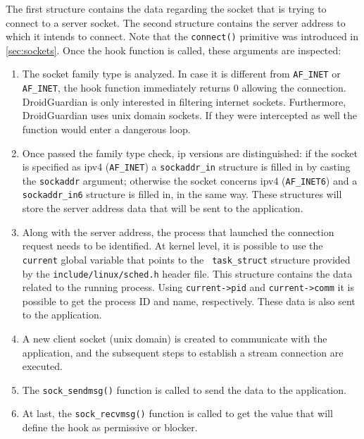 The first structure contains the data regarding the socket that is trying to connect to a server socket. The second structure contains the server address to which it intends to connect. Note that the \texttt{connect()} primitive was introduced in \autoref{sec:sockets}. Once the hook function is called, these arguments are inspected:

\begin{enumerate}
\item The socket family type is analyzed. In case it is different from \texttt{AF\_INET} or \texttt{AF\_INET}, the hook function immediately returns 0 allowing the connection. DroidGuardian is only interested in filtering internet sockets. Furthermore, DroidGuardian uses unix domain sockets. If they were intercepted as well the function would enter a dangerous loop.

\item Once passed the family type check, \gls{ip} versions are distinguished: if the socket is specified as \gls{ip}v4 (\texttt{AF\_INET}) a \texttt{sockaddr\_in} structure is filled in by casting the \texttt{sockaddr} argument; otherwise the socket concerns \gls{ip}v4 (\texttt{AF\_INET6}) and a \texttt{sockaddr\_in6} structure is filled in, in the same way. These structures will store the server address data that will be sent to the application.

\item Along with the server address, the process that launched the connection request needs to be identified. At kernel level, it is possible to use the \texttt{current} global variable that points to the \texttt{ task\_struct} structure provided by the \texttt{include/linux/sched.h} header file. This structure contains the data related to the running process. Using \texttt{current->pid} and \texttt{current->comm} it is possible to get the process ID and name, respectively. These data is also sent to the application.

\item A new client socket (unix domain) is created to communicate with the application, and the subsequent steps to establish a stream connection are executed.

\item The \texttt{sock\_sendmsg()} function is called to send the data to the application.

\item At last, the \texttt{sock\_recvmsg()} function is called to get the value that will define the hook as permissive or blocker.
\end{enumerate}

